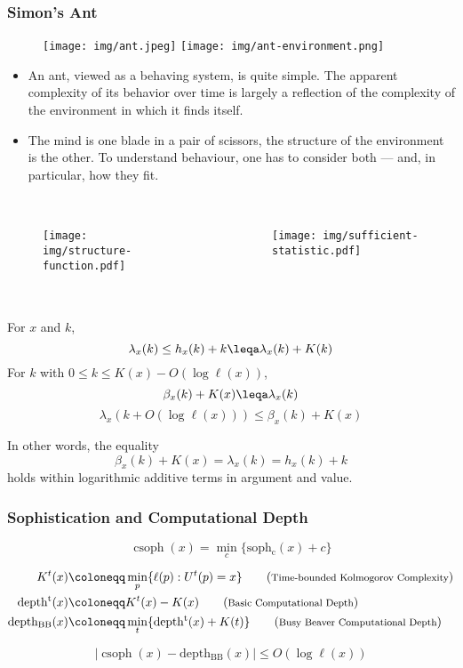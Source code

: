 \documentclass[UTF8,11pt,colorlinks,compress,openany]{beamer}%
\begin{document}
\begin{frame}\frametitle{Simon's Ant}
\begin{figure}[H]
\texttt{[image: img/ant.jpeg]}
\texttt{[image: img/ant-environment.png]}
\end{figure}
\begin{itemize}
	\item An ant, viewed as a behaving system, is quite simple. The apparent complexity of its behavior over time is largely a reflection of the complexity of the environment in which it finds itself.
	\item The mind is one blade in a pair of scissors, the structure of the environment is the other. To understand behaviour, one has to consider both --- and, in particular, how they fit.
\end{itemize}
\end{frame}

\begin{frame}\frametitle{}
\begin{columns}
\begin{figure}[H]
\texttt{[image: img/structure-function.pdf]}
\end{figure}
\begin{figure}[H]
\texttt{[image: img/sufficient-statistic.pdf]}
\end{figure}
\end{columns}
\end{frame}

\begin{frame}\frametitle{}
\begin{theorem}
For $x$ and $k$,
\[\lambda_x(k)\leq h_x(k)+k\leqa\lambda_x(k)+K(k)\]
For $k$ with $0\leq k\leq K(x)-O(\log\ell(x))$,
\[\beta_x(k)+K(x)\leqa\lambda_x(k)\]
\[\lambda_x(k+O(\log \ell(x)))\leq\beta_x(k)+K(x)\]
\end{theorem}
In other words, the equality
\[\beta_x(k)+K(x)=\lambda_x(k)=h_x(k)+k\]
holds within logarithmic additive terms in argument and value.
\end{frame}

\begin{frame}\frametitle{Sophistication and Computational Depth}
\begin{theorem}
\[\operatorname{csoph}(x)=\min\limits_c\{\operatorname{soph_c}(x)+c\}\]
\end{theorem}
\begin{align*}
K^t(x)&\coloneqq \min\limits_p\{\ell(p): U^t(p)=x\}\tag{\text{\footnotesize Time-bounded Kolmogorov Complexity}}\\
\operatorname{depth^t}(x)&\coloneqq K^t(x)-K(x)\tag{\text{\footnotesize Basic Computational Depth}}\\
\operatorname{depth_{BB}}(x)&\coloneqq \min\limits_t\{\operatorname{depth^t}(x)+K(t)\}\tag{\text{\footnotesize Busy Beaver Computational Depth}}
\end{align*}
\begin{theorem}
\[|\operatorname{csoph}(x)-\operatorname{depth_{BB}}(x)|\leq O(\log \ell(x))\]
\end{theorem}
\end{frame}
\end{document}
